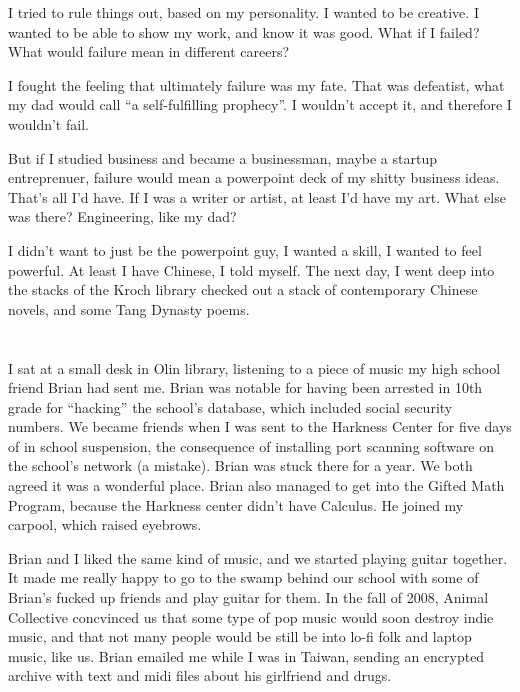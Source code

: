 I tried to rule things out, based on my personality.  I wanted to be creative.
I wanted to be able to show my work, and know it was good.  What if I failed?
What would failure mean in different careers? 

I fought the feeling that ultimately failure was my fate.  That was defeatist,
what my dad would call ``a self-fulfilling prophecy''.  I wouldn't accept it,
and therefore I wouldn't fail.  

But if I studied business and became a businessman, maybe a startup
entreprenuer, failure would mean a powerpoint deck of my shitty business ideas.
That's all I'd have.  If I was a writer or artist, at least I'd have my art.
What else was there?  Engineering, like my dad? 

I didn't want to just be the powerpoint guy, I wanted a skill, I wanted to feel
powerful.  At least I have Chinese, I told myself.  The next day, I went deep
into the stacks of the Kroch library checked out a stack of contemporary Chinese
novels, and some Tang Dynasty poems.

\section{}

I sat at a small desk in Olin library, listening to a piece of music my high
school friend Brian had sent me.  Brian was notable for having been arrested in
10th grade for ``hacking'' the school's database, which included social security
numbers.  We became friends when I was sent to the Harkness Center for five days
of in school suspension, the consequence of installing port scanning software on
the school's network (a mistake).  Brian was stuck there for a year.  We both
agreed it was a wonderful place.  Brian also managed to get into the Gifted Math
Program, because the Harkness center didn't have Calculus.  He joined my carpool,
which raised eyebrows.

Brian and I liked the same kind of music, and we started playing guitar
together.  It made me really happy to go to the swamp behind our school with
some of Brian's fucked up friends and play guitar for them.  In the fall of
2008, Animal Collective concvinced us that some type of pop music would soon
destroy indie music,  and that not many people would be still be into lo-fi folk
and laptop music, like us.  Brian emailed me while I was in Taiwan, sending an
encrypted archive with text and midi files about his girlfriend and drugs.

